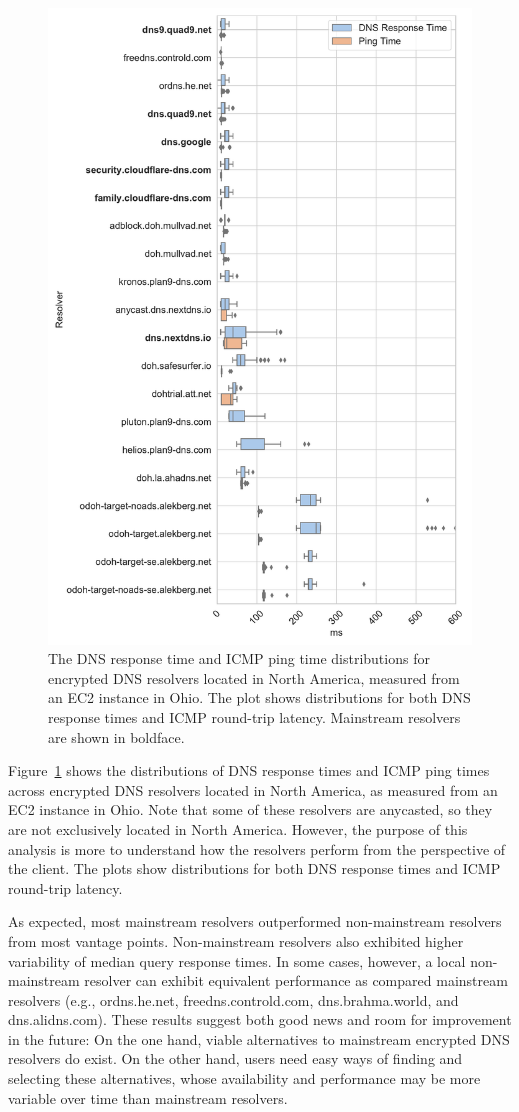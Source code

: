 \begin{figure}[t!]
\centering\includegraphics[width=0.8\columnwidth]{figures/ohio_NA.pdf}
\caption{The DNS response time and ICMP ping time distributions for
    encrypted DNS resolvers located in North America, measured from an EC2
    instance in Ohio.  The plot shows distributions for both DNS response times
    and ICMP round-trip latency. Mainstream resolvers are shown in boldface.}
    \label{fig:dns-us-ohio}
\end{figure}

Figure~\ref{fig:dns-us-ohio} shows the distributions of DNS response times and
ICMP ping times across encrypted DNS resolvers located in North America, as
measured from an EC2 instance in Ohio. Note that some of these resolvers are anycasted,
so they are not exclusively located in North America. However, the purpose of this analysis
is more to understand how the resolvers perform from the perspective of the client.
The plots show distributions for both DNS response times and ICMP round-trip latency.


As expected, most mainstream resolvers outperformed non-mainstream resolvers from most vantage points. Non-mainstream resolvers also exhibited higher variability of median query response times. In some cases, however, a local non-mainstream resolver can exhibit equivalent performance as compared mainstream resolvers (e.g., ordns.he.net, freedns.controld.com, dns.brahma.world, and dns.alidns.com). These results suggest both good news and room for improvement in the future: On the one hand, viable alternatives to mainstream encrypted DNS resolvers do exist. On the other hand, users need easy ways of finding and selecting these alternatives, whose availability and performance may be more variable over time than mainstream resolvers.

